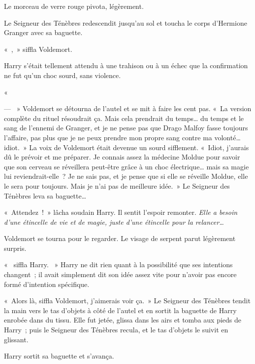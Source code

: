 Le morceau de verre rouge pivota, légèrement.

Le Seigneur des Ténèbres redescendit jusqu'au sol et toucha le corps d'Hermione Granger avec sa baguette.

«~,~» siffla Voldemort.

Harry s'était tellement attendu à une trahison ou à un échec que la confirmation ne fut qu'un choc sourd, sans violence.

«~

--- ~» Voldemort se détourna de l'autel et se mit à faire les cent pas. «~La version complète du rituel résoudrait ça. Mais cela prendrait du temps… du temps et le sang de l'ennemi de Granger, et je ne pense pas que Drago Malfoy fasse toujours l'affaire, pas plus que je ne peux prendre mon propre sang contre ma volonté… idiot.~» La voix de Voldemort était devenue un sourd sifflement. «~Idiot, j'aurais dû le prévoir et me préparer. Je connais assez la médecine Moldue pour savoir que son cerveau se réveillera peut-être grâce à un choc électrique… mais sa magie lui reviendrait-elle~? Je ne sais pas, et je pense que si elle se réveille Moldue, elle le sera pour toujours. Mais je n'ai pas de meilleure idée.~» Le Seigneur des Ténèbres leva sa baguette…

«~Attendez~!~» lâcha soudain Harry. Il sentit l'espoir remonter. \emph{Elle a besoin d'une étincelle de vie et de magie, juste d'une étincelle pour la relancer…}

Voldemort se tourna pour le regarder. Le visage de serpent parut légèrement surpris.

«~ siffla Harry. ~» Harry ne dit rien quant à la possibilité que ses intentions changent~; il avait simplement dit son idée assez vite pour n'avoir pas encore formé d'intention spécifique.

«~Alors là, siffla Voldemort, j'aimerais voir ça.~» Le Seigneur des Ténèbres tendit la main vers le tas d'objets à côté de l'autel et en sortit la baguette de Harry enrobée dans du tissu. Elle fut jetée, glissa dans les airs et tomba aux pieds de Harry~; puis le Seigneur des Ténèbres recula, et le tas d'objets le suivit en glissant.

Harry sortit sa baguette et s'avança.

